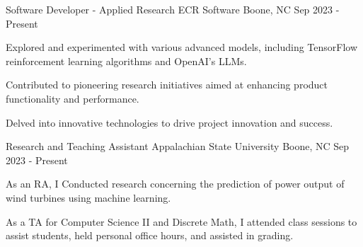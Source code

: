 

\begin{cventries}

  \cventry
    {Software Developer - Applied Research} %
    {ECR Software} %
    {Boone, NC} %
    {Sep 2023 - Present} %
    {
      \begin{cvitems} %
        \item {Explored and experimented with various advanced models, including TensorFlow reinforcement learning algorithms and OpenAI's LLMs.}
        \item {Contributed to pioneering research initiatives aimed at enhancing product functionality and performance.}
        \item {Delved into innovative technologies to drive project innovation and success.}
      \end{cvitems}
    }

  \cventry
    {Research and Teaching Assistant} %
    {Appalachian State University} %
    {Boone, NC} %
    {Sep 2023 - Present} %
    {
      \begin{cvitems} %
        \item {As an RA, I Conducted research concerning the prediction of power output of wind turbines using machine learning.}
        \item {As a TA for Computer Science II and Discrete Math, I attended class sessions to assist students, held personal office hours, and assisted in grading.}
      \end{cvitems}
    }


\end{cventries}
